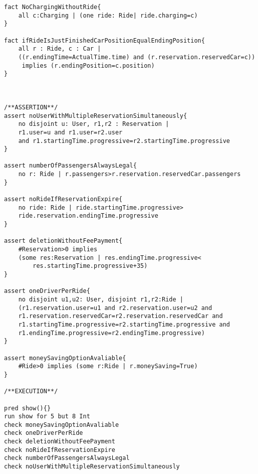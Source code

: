 \documentclass[10pt, a4paper,titlepage]{article}
\begin{document}
\begin{lstlisting}
fact NoChargingWithoutRide{
    all c:Charging | (one ride: Ride| ride.charging=c)
}

fact ifRideIsJustFinishedCarPositionEqualEndingPosition{
    all r : Ride, c : Car | 
	((r.endingTime=ActualTime.time) and (r.reservation.reservedCar=c))
	 implies (r.endingPosition=c.position)
}



/**ASSERTION**/
assert noUserWithMultipleReservationSimultaneously{
    no disjoint u: User, r1,r2 : Reservation |  
	r1.user=u and r1.user=r2.user 
	and r1.startingTime.progressive=r2.startingTime.progressive
}

assert numberOfPassengersAlwaysLegal{
    no r: Ride | r.passengers>r.reservation.reservedCar.passengers
}

assert noRideIfReservationExpire{
    no ride: Ride | ride.startingTime.progressive>
	ride.reservation.endingTime.progressive
}

assert deletionWithoutFeePayment{
    #Reservation>0 implies 
	(some res:Reservation | res.endingTime.progressive<
		res.startingTime.progressive+35)
}

assert oneDriverPerRide{
    no disjoint u1,u2: User, disjoint r1,r2:Ride | 
	(r1.reservation.user=u1 and r2.reservation.user=u2 and 
	r1.reservation.reservedCar=r2.reservation.reservedCar and
	r1.startingTime.progressive=r2.startingTime.progressive and 
	r1.endingTime.progressive=r2.endingTime.progressive)
}

assert moneySavingOptionAvaliable{
    #Ride>0 implies (some r:Ride | r.moneySaving=True)
}

/**EXECUTION**/

pred show(){}
run show for 5 but 8 Int
check moneySavingOptionAvaliable
check oneDriverPerRide
check deletionWithoutFeePayment
check noRideIfReservationExpire
check numberOfPassengersAlwaysLegal
check noUserWithMultipleReservationSimultaneously
\end{lstlisting}
\end{document}
